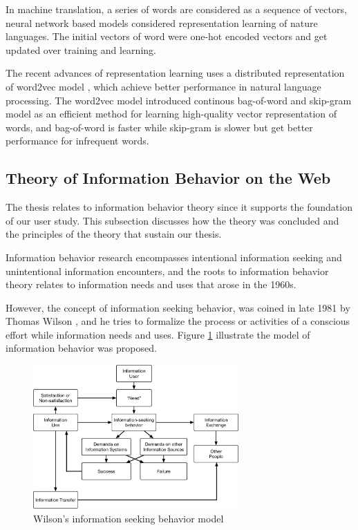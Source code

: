 In machine translation, a series of words are considered as a sequence of
vectors, neural network based models considered representation learning of nature languages.
The initial vectors of word were one-hot encoded vectors and get updated over training and learning.

The recent advances of representation learning uses a distributed representation 
of word2vec model \cite{DBLP:journals/corr/abs-1301-3781}, which achieve better 
performance in natural language processing. The word2vec model introduced 
continous bag-of-word and skip-gram model as an efficient method for learning high-quality
vector representation of words, and bag-of-word is faster while skip-gram is slower but get better
performance for infrequent words.

\subsection{Theory of Information Behavior on the Web}
\label{sec:info-seek}

The thesis relates to information behavior theory since it supports the foundation of our
user study. This subsection discusses how the theory was concluded and 
the principles of the theory that sustain our thesis.

Information behavior research encompasses intentional information seeking and 
unintentional information encounters, and the roots to information behavior 
theory relates to information needs and uses \cite{doi:10.1002/aris.2009.1440430114} 
that arose in the 1960s.

However, the concept of information seeking behavior, was coined in late 1981 
by Thomas Wilson \cite{wilson1981user}, and he tries to formalize the process or 
activities of a conscious effort while information needs 
and uses. Figure \ref{fig:wilson-info-seek} illustrate the model of information behavior 
was proposed.

\begin{figure}
    \centering
    \includegraphics[width=0.7\textwidth]{figures/wilson-info-behavior}
    \caption{Wilson's information seeking behavior model \cite{wilson1981user}}
    \label{fig:wilson-info-seek}
\end{figure}


